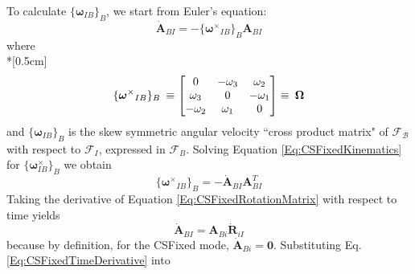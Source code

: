To calculate $\{\mathbf{\boldsymbol\omega}_{IB}\}_B$, we start from Euler's
equation:
%
\begin{equation}
    \dot{\mathbf{A}}_{BI} = -\{\mathbf{\boldsymbol\omega^\times}_{IB}\}_B\mathbf{A}_{BI}
    \label{Eq:CSFixedKinematics}
\end{equation}
%
where\\*[0.5cm]
%
\begin{equation}
    \{ \mathbf{\boldsymbol\omega^\times}_{IB}\}_B\hspace{0.082cm}\equiv
        \begin{bmatrix}
                 0      & -\omega_{3} &  \omega_{2} \\
             \omega_{3} &      0      & -\omega_{1} \\
            -\omega_{2} &  \omega_{1} &      0
        \end{bmatrix}
    \equiv \hspace{0.082cm}\boldsymbol \Omega
    \label{Eq:OmegaCrossMatrix}
\end{equation}
%
and $\{\mathbf{\boldsymbol\omega}_{IB}\}_B$ is the skew symmetric angular
velocity ``cross product matrix" of $\mathcal{F_B}$ with respect to
$\mathcal{F}_I$, expressed in $\mathcal{F}_B$.  Solving Equation
\ref{Eq:CSFixedKinematics} for $\{\mathbf{\boldsymbol\omega}_{IB}^\times\}_B$
we obtain
%
\begin{equation}
    \{\mathbf{\boldsymbol\omega^\times}_{IB}\}_B =  -\dot{\mathbf{A}}_{BI}\mathbf{A}_{BI}^{T}
    \label{Eq:CSFixedKinematics2}
\end{equation}
%
Taking the derivative of Equation \ref{Eq:CSFixedRotationMatrix} with respect to
time yields
%
\begin{equation}
    {\mathbf{\dot A}_{BI}} = \mathbf{A}_{Bi}{\mathbf{\dot R}_{iI}}
    \label{Eq:CSFixedTimeDerivative}
\end{equation}
%
because by definition, for the CSFixed mode,
$ \mathbf{\dot A}_{Bi} = \mathbf{0}$.
Substituting Eq. \ref{Eq:CSFixedTimeDerivative} into
